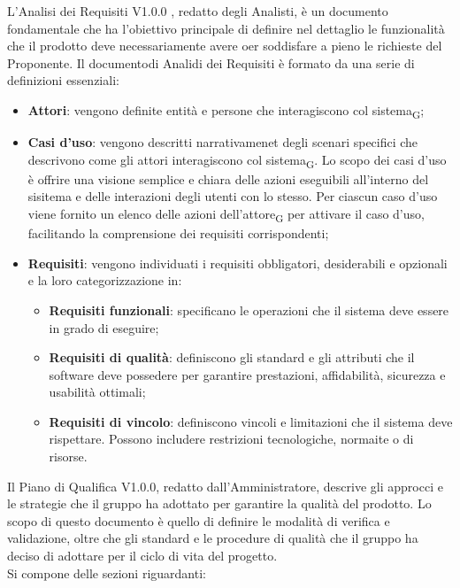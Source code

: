 L'Analisi dei Requisiti V1.0.0 , redatto degli Analisti, è un documento fondamentale che ha l'obiettivo principale di definire nel dettaglio le funzionalità che il prodotto deve necessariamente avere oer soddisfare a pieno le richieste del Proponente. 
Il documentodi Analidi dei Requisiti è formato da una serie di definizioni essenziali:
\begin{itemize}
    \item \textbf{Attori}: vengono definite entità e persone che interagiscono col sistema\textsubscript{G};
    \item \textbf{Casi d'uso}: vengono descritti narrativamenet degli scenari specifici che descrivono come gli attori interagiscono col sistema\textsubscript{G}. Lo scopo dei casi d'uso è offrire una visione semplice e chiara delle azioni eseguibili all'interno del sisitema e delle interazioni degli utenti con lo stesso. Per ciascun caso d'uso viene fornito un elenco delle azioni dell'attore\textsubscript{G} per attivare il caso d'uso, facilitando la comprensione dei requisiti corrispondenti;
    \item \textbf{Requisiti}: vengono individuati i requisiti obbligatori, desiderabili e opzionali e la loro categorizzazione in: 
    \begin{itemize}
        \item \textbf{Requisiti funzionali}: specificano le operazioni che il sistema deve essere in grado di eseguire; 
        \item \textbf{Requisiti di qualità}: definiscono gli standard e gli attributi che il software deve possedere per garantire prestazioni, affidabilità, sicurezza e usabilità ottimali;
        \item \textbf{Requisiti di vincolo}: definiscono vincoli e limitazioni che il sistema deve rispettare. Possono includere restrizioni tecnologiche, normaite o di risorse.
    \end{itemize}
\end{itemize}
Il Piano di Qualifica V1.0.0, redatto dall'Amministratore, descrive gli approcci e le strategie che il gruppo ha adottato per garantire la qualità del prodotto. Lo scopo di questo documento è quello di definire le modalità di verifica e validazione, oltre che gli standard e le procedure di qualità che il gruppo ha deciso di adottare per il ciclo di vita del progetto. \\ 
Si compone delle sezioni riguardanti:
